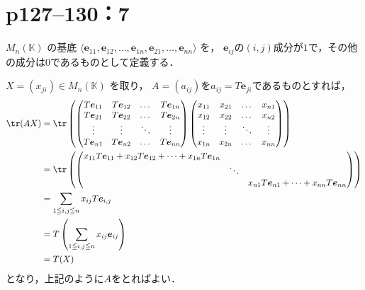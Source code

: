 \section*{p127--130：7}
\begin{tproof}
  $M_n(\mathbb{K})$ の基底 $\langle \bm{e}_{11}, \bm{e}_{12}, \dots, \bm{e}_{1n}, \bm{e}_{21}, \dots, \bm{e}_{nn} \rangle$ を，
  $\bm{e}_{ij}$の$(i,j)$成分が$1$で，その他の成分は$0$であるものとして定義する．

  $X = (x_{ji}) \in M_n(\mathbb{K})$ を取り，
  $A = (a_{ij})$を$a_{ij} = T \bm{e}_{ji}$であるものとすれば，
  \begin{align*}
    \tr (AX) & = \tr \left(
    \begin{pmatrix}
        T \bm{e}_{11} & T \bm{e}_{12} & \dots  & T \bm{e}_{1n} \\
        T \bm{e}_{21} & T \bm{e}_{22} & \dots  & T \bm{e}_{2n} \\
        \vdots        & \vdots        & \ddots & \vdots        \\
        T \bm{e}_{n1} & T \bm{e}_{n2} & \dots  & T \bm{e}_{nn}
      \end{pmatrix}
    \begin{pmatrix}
        x_{11} & x_{21} & \dots  & x_{n1} \\
        x_{12} & x_{22} & \dots  & x_{n2} \\
        \vdots & \vdots & \ddots & \vdots \\
        x_{1n} & x_{2n} & \dots  & x_{nn}
      \end{pmatrix}
    \right)                                                                  \\
             & = \tr \left(
    \begin{pmatrix}
        x_{11}T \bm{e}_{11} + x_{12}T \bm{e}_{12} + \cdots + x_{1n}T \bm{e}_{1n} &                                                             \\
                                                                                 & \ddots &                                                    \\
                                                                                 &        & x_{n1}T \bm{e}_{n1} + \cdots + x_{nn}T \bm{e}_{nn}
      \end{pmatrix}
    \right)                                                                  \\
             & = \sum_{1 \leq i,j \leq n} x_{ij} T \bm{e}_{i,j}              \\
             & = T \left(\sum_{1 \leq i,j \leq n } x_{ij} \bm{e}_{ij}\right) \\
             & = T(X)
  \end{align*}
  となり，上記のように$A$をとればよい．
\end{tproof}



